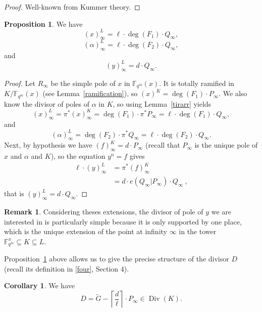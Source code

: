 \documentclass[10pt]{article}
\theoremstyle{definition}
\newtheorem{prop1}[thm]{Proposition}
\newtheorem{coro1}[thm]{Corollary}
\theoremstyle{definition}
\newtheorem{rq1}[thm]{Remark}
\theoremstyle{definition}
\newcommand{\s}{\vspace{0.3cm}}
\newcommand{\cd}{\cdot}
\newcommand{\fqm}{\mathbb{F}_{q^m}}
\newcommand{\su}{\subseteq}
\newcommand{\Div}{\operatorname{Div}}
\begin{document}
\s

\begin{proof}
Well-known from Kummer theory.
\end{proof}

\s

\begin{prop1} \label{propcle}
We have
\[(x)^L_{\infty} = \ell \cd \deg(F_1) \cd Q_{\infty},\]
\[(\alpha)^L_{\infty} = \ell \cd \deg(F_2) \cd Q_{\infty},\]
and
\[(y)^L_{\infty} = d \cd Q_{\infty}.\]
\end{prop1}

\s

\begin{proof}
Let $R_{\infty}$ be the simple pole of $x$ in $\fqm(x)$. It is totally ramified in $K/\fqm(x)$ (see Lemma~\ref{ramification}), so $(x)^K = \deg(F_1) \cd P_{\infty}$. We also know the divisor of poles of $\alpha$ in $K$, so using Lemma~\ref{tirarr} yields
\[(x)^L_{\infty} = \pi^*(x)^K_{\infty} = \deg(F_1) \cd \pi^*P_{\infty} = \ell \cd \deg(F_1) \cd Q_{\infty},\]
and
\[(\alpha)^L_{\infty} = \deg(F_2) \cd \pi^*Q_{\infty} = \ell \cd \deg(F_2) \cd Q_{\infty}.\]
Next, by hypothesis we have $(f)^K_{\infty} = d \cd P_{\infty}$ (recall that $P_{\infty}$ is the unique pole of $x$ and $\alpha$ and $K$), so the equation $y^n=f$ gives
\begin{align*} \ell \cd (y)^L_{\infty} &= \pi^*(f)^K_{\infty} \\
&= d \cd e(Q_{\infty}|P_{\infty}) \cd Q_{\infty} \ ,
\end{align*}
that is $(y)^L_{\infty} = d \cd Q_{\infty}.$
\end{proof}

\s

\begin{rq1} Considering theses extensions, the divisor of pole of $y$ we are interested in is particularly simple because it is only supported by one place, which is the unique extension of the point at infinity $\infty$ in the tower $\fqm^x \su K \su L$.
\end{rq1}

\s

Proposition~\ref{propcle} above allows us to give the precise structure of the divisor $D$ (recall its definition in \eqref{four}, Section 4).

\s

\begin{coro1} \label{diviseurDKummer}
We have
\[D = \tilde{G} - \left\lceil\frac{d}{\ell}\right\rceil \cd P_{\infty} \in \Div(K).\]
\end{coro1}
\end{document}
